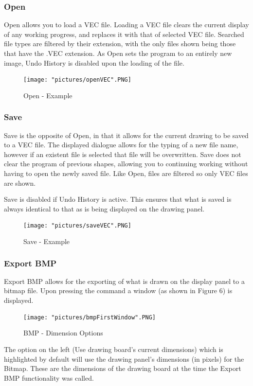 \documentclass[12pt]{article} %
\begin{document}
\subsubsection{Open}
Open allows you to load a VEC file. Loading a VEC file clears the current display of any working progress, and replaces it with that of selected VEC file. Searched file types are filtered by their extension, with the only files shown being those that have the .VEC extension. As Open sets the program to an entirely new image, Undo History is disabled upon the loading of the file.

\begin{figure}[hbtp]
\caption{Open - Example}
\centering
\texttt{[image: "pictures/openVEC".PNG]}
\end{figure}

\subsubsection{Save}
Save is the opposite of Open, in that it allows for the current drawing to be saved to a VEC file. The displayed dialogue allows for the typing of a new file name, however if an existent file is selected that file will be overwritten. Save does not clear the program of previous shapes, allowing you to continuing working without having to open the newly saved file. Like Open, files are filtered so only VEC files are shown. 

Save is disabled if Undo History is active. This ensures that what is saved is always identical to that as is being displayed on the drawing panel.

\begin{figure}[hbtp]
\caption{Save - Example}
\centering
\texttt{[image: "pictures/saveVEC".PNG]}
\end{figure}

\subsubsection{Export BMP}
Export BMP allows for the exporting of what is drawn on the display panel to a bitmap file. Upon pressing the command a window (as shown in Figure 6) is displayed.

\begin{figure}[hbtp]
\caption{BMP - Dimension Options}
\centering
\texttt{[image: "pictures/bmpFirstWindow".PNG]}
\end{figure}

The option on the left (Use drawing board's current dimensions) which is highlighted by default will use the drawing panel's dimensions (in pixels) for the Bitmap. These are the dimensions of the drawing board at the time the Export BMP functionality was called.
\end{document}
